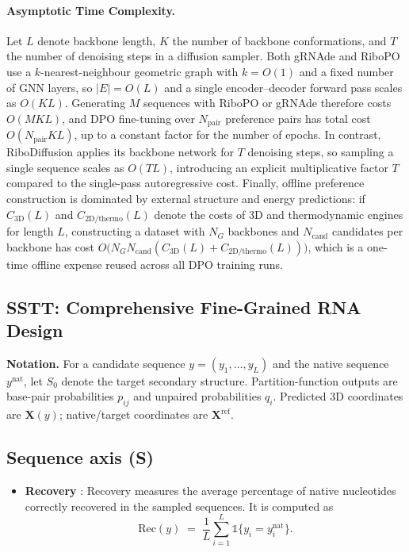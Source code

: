 {\paragraph{Asymptotic Time Complexity.}
Let $L$ denote backbone length, $K$ the number of backbone conformations, and $T$ the number of denoising steps in a diffusion sampler. Both gRNAde and RiboPO use a $k$-nearest-neighbour geometric graph with $k = O(1)$ and a fixed number of GNN layers, so $|E| = O(L)$ and a single encoder--decoder forward pass scales as $O(KL)$. Generating $M$ sequences with RiboPO or gRNAde therefore costs $O(MKL)$, and DPO fine-tuning over $N_{\text{pair}}$ preference pairs has total cost $O(N_{\text{pair}} K L)$, up to a constant factor for the number of epochs. In contrast, RiboDiffusion \citep{huang2024ribodiffusion} applies its backbone network for $T$ denoising steps, so sampling a single sequence scales as $O(TL)$, introducing an explicit multiplicative factor $T$ compared to the single-pass autoregressive cost. Finally, offline preference construction is dominated by external structure and energy predictions: if $C_{\text{3D}}(L)$ and $C_{\text{2D/thermo}}(L)$ denote the costs of 3D and thermodynamic engines for length $L$, constructing a dataset with $N_G$ backbones and $N_{\text{cand}}$ candidates per backbone has cost $O\!\big(N_G N_{\text{cand}} (C_{\text{3D}}(L) + C_{\text{2D/thermo}}(L))\big)$, which is a one-time offline expense reused across all DPO training runs.



\subsection{SSTT: Comprehensive Fine-Grained RNA Design}
\label{subsec:sstt_detail}

\vspace{0.5ex}
\noindent\textbf{Notation.} For a candidate sequence $y=(y_1,\dots,y_L)$ and the native sequence $y^{\mathrm{nat}}$, let $S_0$ denote the target secondary structure. Partition-function outputs are base-pair probabilities $p_{ij}$ and unpaired probabilities $q_i$. Predicted 3D coordinates are $\mathbf{X}(y)$; native/target coordinates are $\mathbf{X}^{\mathrm{ref}}$.

\subsection*{Sequence axis (S)}
\begin{itemize}[leftmargin=1.2em,itemsep=2pt,topsep=2pt]
\item \textbf{Recovery} \citep{dauparas2022proteinmpnn}: Recovery measures the average percentage of native nucleotides correctly recovered in the sampled sequences. It is computed as
$$\mathrm{Rec}(y) \;=\; \frac{1}{L} \sum_{i=1}^{L} \mathbb{1}\{y_i = y_i^{\mathrm{nat}}\}.$$


\end{itemize}}
